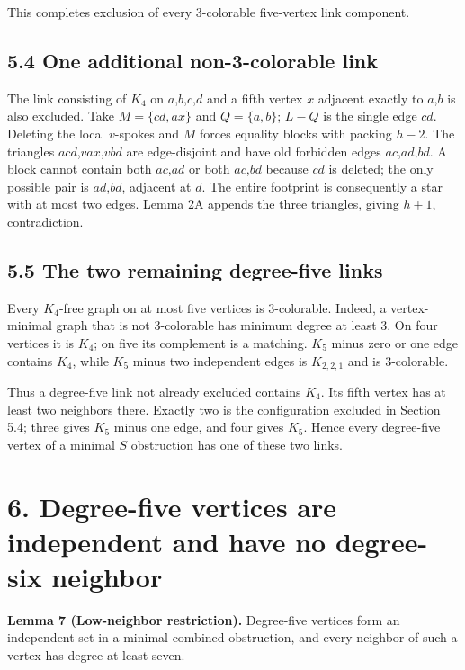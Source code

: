 \documentclass[11pt]{article}
\begin{document}
This completes exclusion of every 3-colorable five-vertex link
component.

\subsection{5.4 One additional non-3-colorable
link}\label{one-additional-non-3-colorable-link}

The link consisting of \(K_4\) on \(a\),\(b\),\(c\),\(d\) and a fifth
vertex \(x\) adjacent exactly to \(a\),\(b\) is also excluded. Take
\(M=\{cd,ax\}\) and \(Q=\{a,b\}\); \(L-Q\) is the single edge \(cd\).
Deleting the local \(v\)-spokes and \(M\) forces equality blocks with
packing \(h-2\). The triangles \(acd\),\(vax\),\(vbd\) are edge-disjoint
and have old forbidden edges \(ac\),\(ad\),\(bd\). A block cannot
contain both \(ac\),\(ad\) or both \(ac\),\(bd\) because \(cd\) is
deleted; the only possible pair is \(ad\),\(bd\), adjacent at \(d\). The
entire footprint is consequently a star with at most two edges. Lemma 2A
appends the three triangles, giving \(h+1\), contradiction.

\subsection{5.5 The two remaining degree-five
links}\label{the-two-remaining-degree-five-links}

Every \(K_4\)-free graph on at most five vertices is 3-colorable.
Indeed, a vertex-minimal graph that is not 3-colorable has minimum
degree at least 3. On four vertices it is \(K_4\); on five its
complement is a matching. \(K_5\) minus zero or one edge contains
\(K_4\), while \(K_5\) minus two independent edges is \(K_{2,2,1}\) and
is 3-colorable.

Thus a degree-five link not already excluded contains \(K_4\). Its fifth
vertex has at least two neighbors there. Exactly two is the
configuration excluded in Section 5.4; three gives \(K_5\) minus one
edge, and four gives \(K_5\). Hence every degree-five vertex of a
minimal \(S\) obstruction has one of these two links.

\section{6. Degree-five vertices are independent and have no degree-six
neighbor}\label{degree-five-vertices-are-independent-and-have-no-degree-six-neighbor}

\textbf{Lemma 7 (Low-neighbor restriction).} Degree-five vertices form
an independent set in a minimal combined obstruction, and every neighbor
of such a vertex has degree at least seven.
\end{document}
